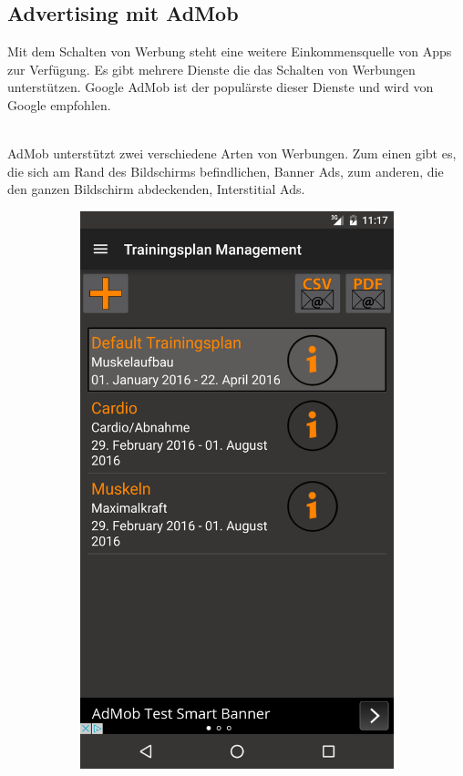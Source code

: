 \documentclass[FIPLY_base.tex]{subfiles}
\author{Andreas Denkmayr}
\date{25. Februar 2016}
\begin{document}
\subsection{Advertising mit AdMob}
Mit dem Schalten von Werbung steht eine weitere Einkommensquelle von Apps zur Verfügung.
Es gibt mehrere Dienste die das Schalten von Werbungen unterstützen.
Google AdMob ist der populärste dieser Dienste und wird von Google empfohlen.

\ \\
AdMob unterstützt zwei verschiedene Arten von Werbungen. 
Zum einen gibt es, die sich am Rand des Bildschirms befindlichen, Banner Ads, zum anderen, die den ganzen Bildschirm abdeckenden, Interstitial Ads. 
\ \\
\begin{figure}[h]
	\begin{subfigure}[b]{0.3\textwidth}
	\includegraphics[scale=0.15]{img/adsBanner}

\end{subfigure}
\end{figure}
\end{document}
